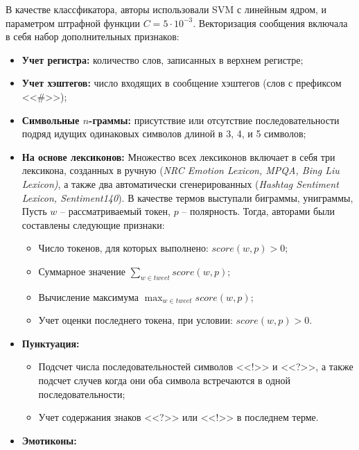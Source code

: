         В качестве классфикатора, авторы использовали SVM с линейным ядром, и
        параметром штрафной функции $C = 5\cdot 10^{-3}$.
        Векторизация сообщения включала в себя набор дополнительных признаков:
        \begin{itemize}
            \item {\bf Учет регистра:} количество слов, записанных в верхнем регистре;
            \item {\bf Учет хэштегов:} число входящих в сообщение хэштегов (слов с префиксом <<\#>>);
            \item {\bf Символьные $n$-граммы:} присутствие или отсутствие последовательности
                подряд идущих одинаковых символов длиной в 3, 4, и 5 символов;
            \item {\bf На основе лексиконов:}
                Множество всех лексиконов включает в себя три лексикона, созданных
                в ручную ({\it NRC Emotion Lexicon, MPQA, Bing Liu Lexicon)}, а также
                два автоматически сгенерированных ({\it Hashtag Sentiment Lexicon,
                Sentiment140}). В качестве термов выступали биграммы, униграммы,
                Пусть $w$ -- рассматриваемый токен, $p$ -- полярность. Тогда,
                авторами были составлены следующие признаки:%
                \begin{itemize}
                    \item Число токенов, для которых выполнено: $score(w, p) > 0$;
                    \item Суммарное значение $\sum_{w \in tweet} score(w,p)$;
                    \item Вычисление максимума $\max_{w \in tweet} score(w,p)$;
                    \item Учет оценки последнего токена, при условии: $score(w,p) > 0$.
                \end{itemize}
            \item {\bf Пунктуация:}
                \begin{itemize}
                    \item Подсчет числа последовательностей символов <<!>> и <<?>>,
                        а также подсчет случев когда они оба символа встречаются в одной последовательности;
                    \item Учет содержания знаков <<?>> или <<!>> в последнем терме.
                \end{itemize}
            \item {\bf Эмотиконы:}

\end{itemize}
